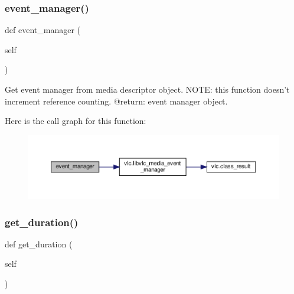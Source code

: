 \subsubsection{\texorpdfstring{event\+\_\+manager()}{event\_manager()}}
{\footnotesize\ttfamily def event\+\_\+manager (\begin{DoxyParamCaption}\item[{}]{self }\end{DoxyParamCaption})}

\begin{DoxyVerb}Get event manager from media descriptor object.
NOTE: this function doesn't increment reference counting.
@return: event manager object.
\end{DoxyVerb}
 Here is the call graph for this function\+:
\nopagebreak
\begin{figure}[H]
\begin{center}
\leavevmode
\includegraphics[width=350pt]{classvlc_1_1_media_ab7c92812cd259eb8e4e4fd292b81bfaa_cgraph}
\end{center}
\end{figure}
\mbox{\label{classvlc_1_1_media_a2915bf55d38ef271444cdba23ba59f2f}} 
\subsubsection{\texorpdfstring{get\+\_\+duration()}{get\_duration()}}
{\footnotesize\ttfamily def get\+\_\+duration (\begin{DoxyParamCaption}\item[{}]{self }\end{DoxyParamCaption})}

